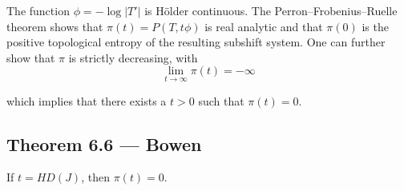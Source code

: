 \documentclass[11pt,a4paper]{article}
\begin{document}
The function $\phi=-\log|T'|$ is H\"older continuous. The Perron--Frobenius--Ruelle theorem shows
that $\pi(t)=P(T,t\phi)$ is real analytic and that $\pi(0)$ is the positive
topological entropy of the resulting subshift system. One can further show
that $\pi$ is strictly decreasing, with
$$\lim_{t\rightarrow \infty}\pi(t) = -\infty$$

which implies that there exists a $t>0$ such that $\pi(t) = 0$.
\subsection*{Theorem 6.6 — Bowen} If $t=HD(J)$, then $\pi(t)=0$.


\end{document}
